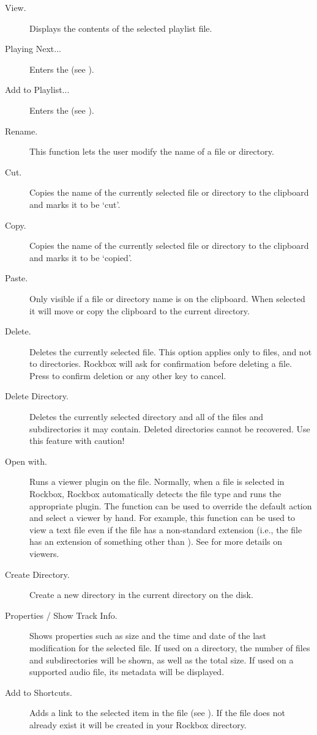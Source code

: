 \begin{description}
\item [View.]
  Displays the contents of the selected playlist file.
\item [Playing Next...]
  Enters the  (see ).
\item [Add to Playlist...]
  Enters the  (see
  ).
\item [Rename.]
  This function lets the user modify the name of a file or directory.
\item [Cut.]
  Copies the name of the currently selected file or directory to the clipboard
  and marks it to be `cut'.
\item [Copy.]
  Copies the name of the currently selected file or directory to the clipboard
  and marks it to be `copied'.
\item [Paste.]
  Only visible if a file or directory name is on the clipboard. When selected
  it will move or copy the clipboard to the current directory.
\item [Delete.]
  Deletes the currently selected file. This option applies only to files, and
  not to directories. Rockbox will ask for confirmation before deleting a file.
  Press \ActionYesNoAccept{}
  to confirm deletion or any other key to cancel.
\item [Delete Directory.]
  Deletes the currently selected directory and all of the files and subdirectories
  it may contain. Deleted directories cannot be recovered. Use this feature with
  caution!
\item [Open with.]
  Runs a viewer plugin on the file. Normally, when a file is selected in Rockbox,
  Rockbox automatically detects the file type and runs the appropriate plugin.
  The  function can be used to override the default action and
  select a viewer by hand.
  For example, this function can be used to view a text file
  even if the file has a non-standard extension (i.e., the file has an extension
  of something other than ). See 
  for more details on viewers.
\item [Create Directory.]
  Create a new directory in the current directory on the disk.
\item [Properties / Show Track Info.]
  Shows properties such as size and the time and date of the last modification
  for the selected file. If used on a directory, the number of files and
  subdirectories will be shown, as well as the total size. If used on a supported
  audio file, its metadata will be displayed.
\item [Add to Shortcuts.]
  Adds a link to the selected item in the  file
  (see ).
  If the file does not already exist it will be created in your Rockbox directory.
\end{description}

